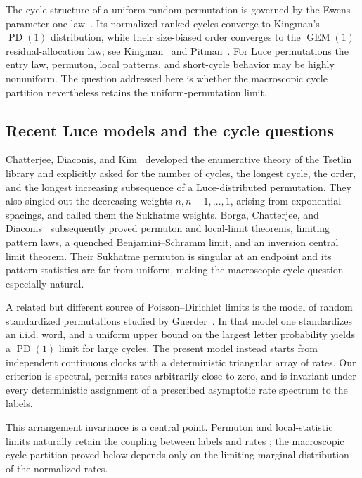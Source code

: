 \documentclass[11pt]{article}
\theoremstyle{definition}
\theoremstyle{remark}
\newcommand{\PD}{\operatorname{PD}}
\newcommand{\GEM}{\operatorname{GEM}}
\begin{document}
The cycle structure of a uniform random permutation is governed by the Ewens
parameter-one law~\cite{Ewens1972}.  Its normalized ranked cycles converge to
Kingman's $\PD(1)$ distribution, while their size-biased order converges to the
$\GEM(1)$ residual-allocation law; see Kingman~\cite{Kingman1975} and
Pitman~\cite[Chapter~3]{Pitman2006}.  For Luce permutations the entry law,
permuton, local patterns, and short-cycle behavior may be highly nonuniform.
The question addressed here is whether the macroscopic cycle partition
nevertheless retains the uniform-permutation limit.

\subsection*{Recent Luce models and the cycle questions}

Chatterjee, Diaconis, and Kim~\cite{CDK2024} developed the enumerative theory
of the Tsetlin library and explicitly asked for the number of cycles, the
longest cycle, the order, and the longest increasing subsequence of a
Luce-distributed permutation.  They also singled out the decreasing weights
$n,n-1,\ldots,1$, arising from exponential spacings, and called them the
Sukhatme weights.  Borga, Chatterjee, and Diaconis~\cite{BCD2026} subsequently
proved permuton and local-limit theorems, limiting pattern laws, a quenched
Benjamini--Schramm limit, and an inversion central limit theorem.  Their
Sukhatme permuton is singular at an endpoint and its pattern statistics are
far from uniform, making the macroscopic-cycle question especially natural.

A related but different source of Poisson--Dirichlet limits is the model of
random standardized permutations studied by Guerder~\cite{Guerder2026}.  In
that model one standardizes an i.i.d. word, and a uniform upper bound on the
largest letter probability yields a $\PD(1)$ limit for large cycles.  The
present model instead starts from independent continuous clocks with a
deterministic triangular array of rates.  Our criterion is spectral, permits
rates arbitrarily close to zero, and is invariant under every deterministic
assignment of a prescribed asymptotic rate spectrum to the labels.

This arrangement invariance is a central point.  Permuton and local-statistic
limits naturally retain the coupling between labels and rates
\cite{BCD2026}; the macroscopic cycle partition proved below depends only on
the limiting marginal distribution of the normalized rates.
\end{document}
